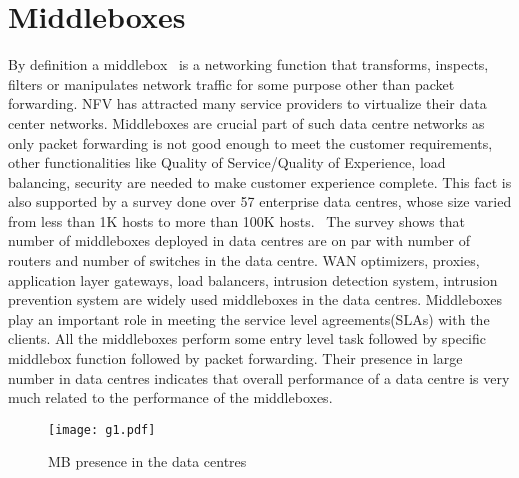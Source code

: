 \documentclass[a4paper,11pt]{report}
\begin{document}
\section{Middleboxes}
By definition a middlebox~\cite{MB} is a networking function that transforms, inspects, filters or manipulates network traffic for some purpose other than packet forwarding. NFV has attracted many service providers to virtualize their data center networks. Middleboxes are crucial part of such data centre networks as only packet forwarding is not good enough to meet the customer requirements, other functionalities like Quality of Service/Quality of Experience, load balancing, security are needed to make customer experience complete. This fact is also supported by a survey done over 57 enterprise data centres, whose size varied from less than 1K hosts to more than 100K hosts.~\cite{DM} The survey shows that number of middleboxes deployed in data centres are on par with number of routers and number of switches in the data centre. WAN optimizers, proxies, application layer gateways, load balancers, intrusion detection system, intrusion prevention system are widely used middleboxes in the data centres. Middleboxes play an important role in meeting the service level agreements(SLAs) with the clients. All the middleboxes perform some entry level task followed by specific middlebox function followed by packet forwarding. Their presence in large number in data centres indicates that overall performance of a data centre is very much related to the performance of the middleboxes. %
\begin{figure}[h]
\centering
\texttt{[image: g1.pdf]}
\caption{MB presence in the data centres~\cite{DM}}
\end{figure}
\end{document}
